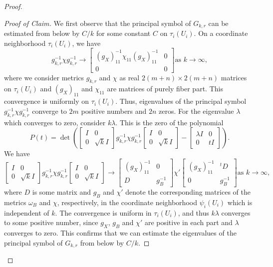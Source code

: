 \documentclass{amsart}
\numberwithin{equation}{section}
\theoremstyle{plain}
\theoremstyle{definition}
\theoremstyle{remark}
\begin{document}
\begin{proof}
\begin{proof}[Proof of Claim]
We first observe that the principal symbol of $G_{k,r}$ can be estimated from below by $C/k$ for some constant $C$ on $\tau_i(U_i)$. On a coordinate neighborhood $\tau_i(U_i)$, we have
$$g_{k,r}^{-1}\chi g_{k,r}^{-1} \rightarrow  \begin{bmatrix} (g_X)_{11}^{-1} \chi_{11} (g_X)_{11}^{-1} & 0 \\ 0& 0\end{bmatrix} \text{as $k \rightarrow \infty$},$$
where we consider metrics $g_{k,r}$ and $\chi$ as real $2(m+n) \times 2(m+n)$ matrices on $\tau_i(U_i)$ and $(g_X)_{11}$ and $\chi_{11}$ are matrices of purely fiber part.
This convergence is uniformly on $\tau_i(U_i)$. Thus, eigenvalues of the principal symbol $g_{k,r}^{-1}\chi g_{k,r}^{-1}$ converge to $2m$ positive numbers and $2n$ zeros. For the eigenvalue $\lambda$ which converges to zero, consider $k \lambda$. This is the zero of the polynomial
$$P(t)= \det{\left(
\begin{bmatrix}
    I & 0 \\ 0 & \sqrt{k}I
\end{bmatrix}
g_{k,r}^{-1} \chi g_{k,r}^{-1}
\begin{bmatrix}
    I & 0 \\ 0 & \sqrt{k}I
\end{bmatrix}
- \begin{bmatrix}
    \lambda I & 0 \\ 0 & t I
\end{bmatrix}\right)}.$$
We have
$$\begin{bmatrix}
    I & 0 \\ 0 & \sqrt{k}I
\end{bmatrix}
g_{k,r}^{-1} \chi g_{k,r}^{-1}
\begin{bmatrix}
    I & 0 \\ 0 & \sqrt{k}I
\end{bmatrix} \rightarrow 
\begin{bmatrix}
    (g_X)^{-1}_{11} & 0 \\ D & g_B^{-1}
\end{bmatrix}
\chi'
\begin{bmatrix}
    (g_X)^{-1}_{11} & {}^t\! D \\ 0 & g_B^{-1}
\end{bmatrix} \text{as $k \rightarrow \infty$},$$
where $D$ is some matrix and $g_B$ and $\chi'$ denote the corresponding matrices of the metrics $\omega_B$ and $\chi$, respectively, in the coordinate neighborhood $\psi_i(U_i)$ which is independent of $k$. 
The convergence is uniform in $\tau_i(U_i)$, and thus $k \lambda$ converges to some positive number, since $g_X$, $g_B$ and $\chi'$ are positive in each part and $\lambda$ converges to zero. This confirms that we can estimate the eigenvalues of the principal symbol of $G_{k,r}$ from below by $C/k$. 

\end{proof}
\end{proof}
\end{document}
